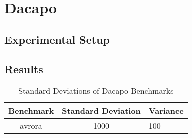 \documentclass{sig-alternate}
\begin{document}
\section{Dacapo}

\subsection{Experimental Setup}

\subsection{Results}

%
%
\begin{table}
\centering
\caption{Standard Deviations of Dacapo Benchmarks}
\begin{tabular}{|c|c|l|} \hline
Benchmark&Standard Deviation&Variance\\ \hline
avrora &1000&100\\
\hline\end{tabular}
\end{table}


\end{document}
